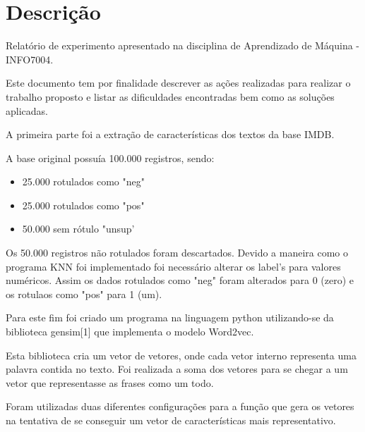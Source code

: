 \documentclass[
	article,			%
	11pt,				%
	oneside,			%
	a4paper,			%
	english,			%
	brazil,				%
	sumario=tradicional,
	fleqn				%
	]{abntex2}
\begin{document}

\frenchspacing 

\maketitle



\textual

\section{Descrição}

Relatório de experimento apresentado na disciplina de Aprendizado de Máquina - INFO7004.


Este documento tem por finalidade descrever as ações realizadas para realizar o trabalho proposto e listar as dificuldades encontradas bem como as soluções aplicadas.


A primeira parte foi a extração de características dos textos da base IMDB.

A base original possuía 100.000 registros, sendo:

\begin{itemize}
	\item 25.000 rotulados como "neg"
	\item 25.000 rotulados como "pos"
	\item 50.000 sem rótulo "unsup'
\end{itemize}

Os 50.000 registros não rotulados foram descartados.
Devido a maneira como o programa KNN foi implementado foi necessário alterar os label's para valores numéricos.
Assim os dados rotulados como "neg" foram alterados para 0 (zero) e os rotulaos como "pos"  para 1 (um).

Para este fim foi criado um programa na linguagem python utilizando-se da biblioteca gensim[1] que implementa o modelo Word2vec.

Esta biblioteca cria um vetor de vetores, onde cada vetor interno representa uma palavra contida no texto.
Foi realizada a soma dos vetores para se chegar a um vetor que representasse as frases como um todo.

Foram utilizadas duas diferentes configurações para a função que gera os vetores na tentativa de se conseguir um vetor de características mais representativo.
\end{document}
